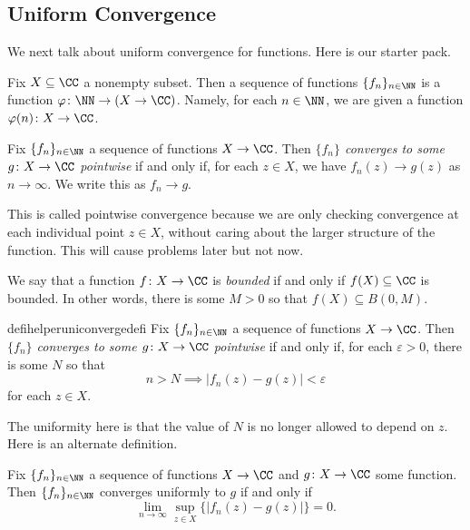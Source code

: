 \subsection{Uniform Convergence}
We next talk about uniform convergence for functions. Here is our starter pack.
\begin{definition}
	Fix $X\subseteq\CC$ a nonempty subset. Then a sequence of functions $\{f_n\}_{n\in\NN}$ is a function $\varphi\colon \NN\to(X\to\CC)$. Namely, for each $n\in\NN$, we are given a function $\varphi(n)\colon X\to\CC$.
\end{definition}
\begin{definition}
	Fix $\{f_n\}_{n\in\NN}$ a sequence of functions $X\to\CC$. Then \textit{$\{f_n\}$ converges to some $g\colon X\to\CC$ pointwise} if and only if, for each $z\in X$, we have $f_n(z)\to g(z)$ as $n\to\infty$. We write this as $f_n\to g$.
\end{definition}
This is called pointwise convergence because we are only checking convergence at each individual point $z\in X$, without caring about the larger structure of the function. This will cause problems later but not now.
\begin{definition}[Bounded]
	We say that a function $f\colon X\to\CC$ is \textit{bounded} if and only if $f(X)\subseteq\CC$ is bounded. In other words, there is some $M>0$ so that $f(X)\subseteq B(0,M)$.
\end{definition}
\begin{restatable}{defihelper}{uniconvergedefi} 
	Fix $\{f_n\}_{n\in\NN}$ a sequence of functions $X\to\CC$. Then \textit{$\{f_n\}$ converges to some $g\colon X\to\CC$ pointwise} if and only if, for each $\varepsilon>0$, there is some $N$ so that
	\[n>N\implies|f_n(z)-g(z)|<\varepsilon\]
	for each $z\in X$.
\end{restatable}
The uniformity here is that the value of $N$ is no longer allowed to depend on $z$. Here is an alternate definition.
\begin{proposition} \label{prop:definefuncdist}
	Fix $\{f_n\}_{n\in\NN}$ a sequence of functions $X\to\CC$ and $g\colon X\to\CC$ some function. Then $\{f_n\}_{n\in\NN}$ converges uniformly to $g$ if and only if
	\[\lim_{n\to\infty}\sup_{z\in X}\{|f_n(z)-g(z)|\}=0.\]
\end{proposition}
